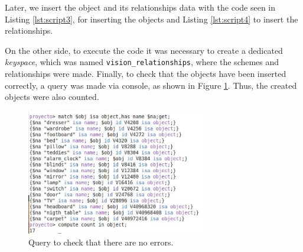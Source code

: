 

Later, we insert the object and its relationships data with the code seen in Listing \ref{lst:script3}, for inserting the objects and Listing \ref{lst:script4} to insert the relationships.





On the other side, to execute the code it was necessary to create a dedicated \textit{keyspace}, which was named \texttt{vision\_relationships}, where the schemes and relationships were made. Finally, to check that the objects have been inserted correctly, a query was made via console, as shown in Figure \ref{fig:correct}. Thus, the created objects were also counted.
\begin{figure}[H]
     \includegraphics[width=8cm]{figures/numObje.jpeg}
     \caption{Query to check that there are no errors.}
     \label{fig:correct}
\end{figure}